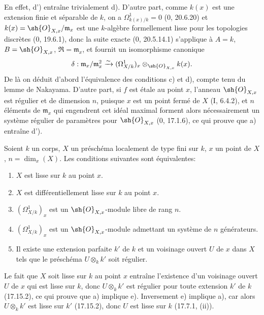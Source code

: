 En effet, d') entraîne trivialement d). D'autre part, comme $k(x)$ est une extension finie et séparable de $k$, on a $\Omega^1_{k(x)/k}=0$ (0, 20.6.20) et $k(x)=\sh{O}_{X,x}/\mathfrak m_x$ est une $k$-algèbre formellement lisse pour les topologies discrètes (0, 19.6.1), donc la suite exacte (0, 20.5.14.1) s'applique à $A=k$, $B=\sh{O}_{X,x}$, $\mathfrak{R}=\mathfrak m_x$, et fournit un isomorphisme canonique
\[
\delta:\mathfrak m_x/\mathfrak m_x^2\xrightarrow{\sim}(\Omega^1_{X/k})_x\otimes_{\sh{O}_{X,x}}k(x).
\]
De là on déduit d'abord l'équivalence des conditions c) et d), compte tenu du lemme de Nakayama. D'autre part, si $f$ est étale au point $x$, l'anneau $\sh{O}_{X,x}$ est régulier et de dimension $n$, puisque $x$ est un point fermé de $X$ (I, 6.4.2), et $n$ éléments de $\mathfrak m_x$ qui engendrent cet idéal maximal forment alors nécessairement un système régulier de paramètres pour $\sh{O}_{X,x}$ (0, 17.1.6), ce qui prouve que a) entraîne d').

\begin{proposition}[17.15.5]
\label{IV.17.15.5}
Soient $k$ un corps, $X$ un préschéma localement de type fini sur $k$, $x$ un point de $X$, $n=\dim_x(X)$. Les conditions suivantes sont équivalentes:
\begin{enumerate}
  \item[a)] $X$ est lisse sur $k$ au point $x$.
  \item[b)] $X$ est différentiellement lisse sur $k$ au point $x$.
  \item[c)] $(\Omega^1_{X/k})_x$ est un $\sh{O}_{X,x}$-module libre de rang $n$.
  \item[d)] $(\Omega^1_{X/k})_x$ est un $\sh{O}_{X,x}$-module admettant un système de $n$ générateurs.


  \item[e)] Il existe une extension parfaite $k'$ de $k$ et un voisinage ouvert $U$ de $x$ dans $X$ tels que le préschéma $U\otimes_k k'$ soit régulier.
\end{enumerate}
\end{proposition}

Le fait que $X$ soit lisse sur $k$ au point $x$ entraîne l'existence d'un voisinage ouvert $U$ de $x$ qui est lisse sur $k$, donc $U\otimes_k k'$ est régulier pour toute extension $k'$ de $k$ (17.15.2), ce qui prouve que a) implique e). Inversement e) implique a), car alors $U\otimes_k k'$ est lisse sur $k'$ (17.15.2), donc $U$ est lisse sur $k$ (17.7.1, (ii)).

